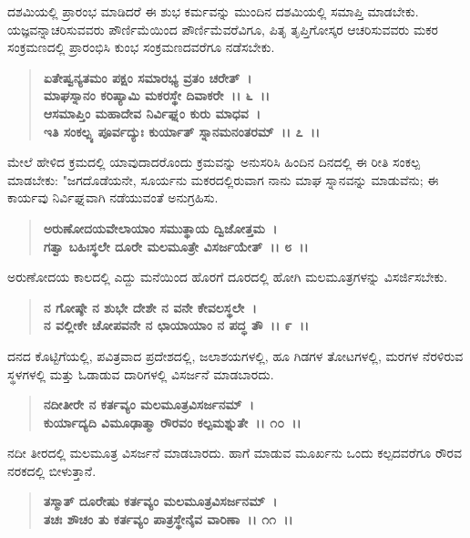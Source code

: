 ದಶಮಿಯಲ್ಲಿ ಪ್ರಾರಂಭ ಮಾಡಿದರೆ ಈ ಶುಭ ಕರ್ಮವನ್ನು ಮುಂದಿನ ದಶಮಿಯಲ್ಲಿ ಸಮಾಪ್ತಿ ಮಾಡಬೇಕು. ಯಜ್ಞವನ್ನಾಚರಿಸುವವರು ಪೌರ್ಣಿಮೆಯಿಂದ ಪೌರ್ಣಿಮೆವರೆವಿಗೂ, ಪಿತೃ ತೃಪ್ತಿಗೋಸ್ಕರ ಆಚರಿಸುವವರು ಮಕರ ಸಂಕ್ರಮಣದಲ್ಲಿ ಪ್ರಾರಂಭಿಸಿ ಕುಂಭ ಸಂಕ್ರಮಣದವರೆಗೂ ನಡೆಸಬೇಕು.

\begin{verse}
\textbf{ಏತೇಷ್ವನ್ಯತಮಂ ಪಕ್ಷಂ ಸಮಾರಭ್ಯ ವ್ರತಂ ಚರೇತ್~।}\\\textbf{ಮಾಘಸ್ನಾನಂ ಕರಿಷ್ಯಾಮಿ ಮಕರಸ್ಥೇ ದಿವಾಕರೇ~।। ೬~।।}\\\textbf{ಆಸಮಾಪ್ತಿಂ ಮಹಾದೇವ ನಿರ್ವಿಘ್ನಂ ಕುರು ಮಾಧವ~।}\\\textbf{ಇತಿ ಸಂಕಲ್ಪ್ಯ ಪೂರ್ವದ್ಯುಃ ಕುರ್ಯಾತ್ ಸ್ನಾನಮನಂತರಮ್~।। ೭~।।}
\end{verse}

ಮೇಲೆ ಹೇಳಿದ ಕ್ರಮದಲ್ಲಿ ಯಾವುದಾದರೊಂದು ಕ್ರಮವನ್ನು ಅನುಸರಿಸಿ ಹಿಂದಿನ ದಿನದಲ್ಲಿ ಈ ರೀತಿ ಸಂಕಲ್ಪ ಮಾಡಬೇಕು: "ಜಗದೊಡೆಯನೇ, ಸೂರ್ಯನು ಮಕರದಲ್ಲಿರುವಾಗ ನಾನು ಮಾಘ ಸ್ನಾನವನ್ನು ಮಾಡುವೆನು; ಈ ಕಾರ್ಯವು ನಿರ್ವಿಘ್ನವಾಗಿ ನಡೆಯುವಂತೆ ಅನುಗ್ರಹಿಸು.

\begin{verse}
\textbf{ಅರುಣೋದಯವೇಲಾಯಾಂ ಸಮುತ್ಥಾಯ ದ್ವಿಜೋತ್ತಮ~।}\\\textbf{ಗತ್ವಾ ಬಹಿಃಸ್ಥಲೇ ದೂರೇ ಮಲಮೂತ್ರೇ ವಿಸರ್ಜಯೇತ್~।। ೮~।।}
\end{verse}

ಅರುಣೋದಯ ಕಾಲದಲ್ಲಿ ಎದ್ದು ಮನೆಯಿಂದ ಹೊರಗೆ ದೂರದಲ್ಲಿ ಹೋಗಿ ಮಲಮೂತ್ರಗಳನ್ನು ವಿಸರ್ಜಿಸಬೇಕು.

\begin{verse}
\textbf{ನ ಗೋಷ್ಠೇ ನ ಶುಭೇ ದೇಶೇ ನ ವನೇ ಕೇವಲಸ್ಥಲೇ~।}\\\textbf{ನ ವಲ್ಲೀಕೇ ಚೋಪವನೇ ನ ಛಾಯಾಯಾಂ ನ ಪದ್ಧ ತೌ~।। ೯~।।}
\end{verse}

ದನದ ಕೊಟ್ಟಿಗೆಯಲ್ಲಿ, ಪವಿತ್ರವಾದ ಪ್ರದೇಶದಲ್ಲಿ, ಜಲಾಶಯಗಳಲ್ಲಿ, ಹೂ ಗಿಡಗಳ ತೋಟಗಳಲ್ಲಿ, ಮರಗಳ ನೆರಳಿರುವ ಸ್ಥಳಗಳಲ್ಲಿ ಮತ್ತು ಓಡಾಡುವ ದಾರಿಗಳಲ್ಲಿ ವಿಸರ್ಜನೆ ಮಾಡಬಾರದು.

\begin{verse}
\textbf{ನದೀತೀರೇ ನ ಕರ್ತವ್ಯಂ ಮಲಮೂತ್ರವಿಸರ್ಜನಮ್~।}\\\textbf{ಕುರ್ಯಾದ್ಯದಿ ವಿಮೂಢಾತ್ಮಾ ರೌರವಂ ಕಲ್ಪಮಶ್ನುತೇ~।। ೧೦~।।}
\end{verse}

ನದೀ ತೀರದಲ್ಲಿ ಮಲಮೂತ್ರ ವಿಸರ್ಜನೆ ಮಾಡಬಾರದು. ಹಾಗೆ ಮಾಡುವ ಮೂರ್ಖನು ಒಂದು ಕಲ್ಪದವರೆಗೂ ರೌರವ ನರಕದಲ್ಲಿ ಬೀಳುತ್ತಾನೆ.

\begin{verse}
\textbf{ತಸ್ಮಾತ್ ದೂರೇಷು ಕರ್ತವ್ಯಂ ಮಲಮೂತ್ರವಿಸರ್ಜನಮ್~।}\\\textbf{ತಚಃ ಶೌಚಂ ತು ಕರ್ತವ್ಯಂ ಪಾತ್ರಸ್ಥೇನೈವ ವಾರಿಣಾ~।। ೧೧~।।}
\end{verse}

